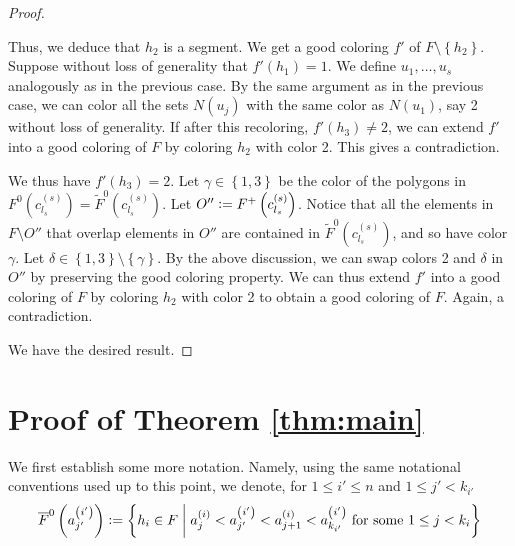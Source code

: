 \documentclass[12pt]{article}
\theoremstyle{definition}
\newcommand{\defeq}{\vcentcolon=}
\begin{document}
\begin{proof}
\begin{itemize}
             Thus, we deduce that $h_2$ is a segment.
             We get a good coloring $f'$ of
             $F \setminus \left\{h_2\right\}$.
             Suppose without loss of generality
             that $f'\left(h_1\right) = 1$.
             We define $u_1, \ldots, u_{s}$ 
             analogously as in the previous case.
             By the same argument as in the previous case,
             we can color all the sets 
             $N\left(u_{j}\right)$ with the
             same color as $N\left(u_1\right)$,
             say 2 without loss of generality.
             If after this recoloring,
             $f'\left(h_3\right) \neq 2$, 
             we can extend $f'$ into a
             good coloring of $F$ by 
             coloring $h_2$ with color 2.
             This gives a contradiction.
             
             We thus have $f'\left(h_3\right) = 2$.
             Let $\gamma \in \left\{1, 3\right\}$
             be the color of the polygons
             in $F^{0}\left(c_{l_{s}}^{\left(s\right)}\right)
             = \widetilde{F}^{0}\left(
             c_{l_{s}}^{\left(s\right)}\right)$.
             Let $O'' \defeq F^{+}\left(
             c_{l_{s}}^{\left(s\right)}\right)$.
             Notice that all the elements
             in $F \setminus O''$ 
             that overlap elements in $O''$
             are contained in $\widetilde{F}^{0}\left(
             c_{l_{s}}^{\left(s\right)}\right)$,
             and so have color $\gamma$.
             Let $\delta \in \left\{1, 3\right\}
             \setminus \left\{\gamma\right\}$.
             By the above discussion, we can swap colors
             2 and $\delta$ in $O''$
             by preserving the good coloring property.
             We can thus extend $f'$ into a
             good coloring of $F$ by
             coloring $h_2$ with color 2
             to obtain a good coloring of $F$.
             Again, a contradiction.
         \end{itemize} 
     We have the desired result. 
     \end{proof}

     \section{Proof of Theorem \ref{thm:main}}

     We first establish some more notation.
     Namely, using the same notational conventions
     used up to this point, we denote, for
     $1 \leq i' \leq n$ and $1 \leq j' < k_{i'}$
     \begin{gather*}
         \overline{F}^{0}\left(a_{j'}^{\left(i'\right)}\right) \defeq
         \left\{h_{i} \in F \;\middle|\;
         a_{j}^{\left(i\right)} <
         a_{j'}^{\left(i'\right)} <
         a_{j+1}^{\left(i\right)} <
         a_{k_{i'}}^{\left(i'\right)}
         \text{ for some }
         1 \leq j < k_{i}\right\}
     \end{gather*}
     
\end{document}
